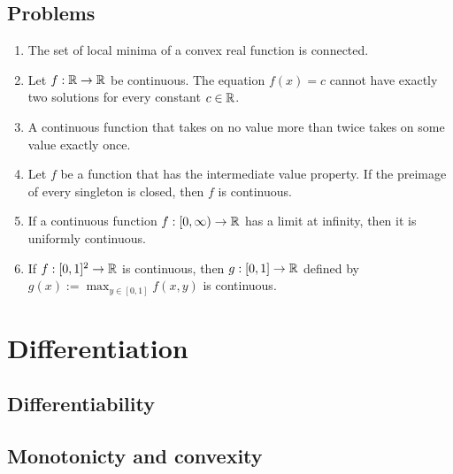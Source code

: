 \documentclass{../../large}
\begin{document}
\section*{Problems}
\begin{enumerate}
\item The set of local minima of a convex real function is connected.
\item Let $f:\mathbb{R}\to\mathbb{R}$ be continuous.
The equation $f(x)=c$ cannot have exactly two solutions for every constant $c\in\mathbb{R}$.
\item A continuous function that takes on no value more than twice takes on some value exactly once.
\item Let $f$ be a function that has the intermediate value property.
If the preimage of every singleton is closed, then $f$ is continuous.
\item If a continuous function $f:[0,\infty)\to\mathbb{R}$ has a limit at infinity, then it is uniformly continuous.
\item If $f:[0,1]^2\to\mathbb{R}$ is continuous, then $g:[0,1]\to\mathbb{R}$ defined by $g(x):=\max_{y\in[0,1]}f(x,y)$ is continuous.
\end{enumerate}







\chapter{Differentiation}
\section{Differentiability}
\begin{prb}
\end{prb}

\section{Monotonicty and convexity}
\end{document}
